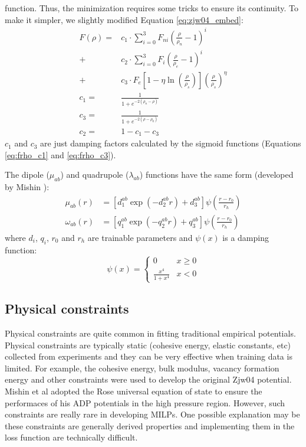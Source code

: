 \documentclass[prb,reprint,superscriptaddress]{revtex4-2}
\begin{document}
function. Thus, the minimization requires some tricks to ensure its continuity.
To make it simpler, we slightly modified Equation \ref{eq:zjw04_embed}:
\begin{align}
\label{eq:zjw04xc_embed}
F(\rho) 
= & c_1 \cdot
\sum_{i=0}^{3}{F_{ni}\left( \frac{\rho}{\rho_n} - 1 \right)^{i}} \nonumber \\
+ & c_2 \cdot 
\sum_{i=0}^{3}{F_{i}\left( \frac{\rho}{\rho_e} - 1 \right)^{i}} \nonumber \\
+ & c_3 \cdot
F_{e}\left[1 - \eta\ln\left( \frac{\rho}{\rho_s}\right)\right]
(\frac{\rho}{\rho_s})^{\eta} \\
\label{eq:frho_c1}
c_{1} = & \frac{1}{1 + e^{-2\left(\rho_{n} - \rho\right)}} \\
\label{eq:frho_c3}
c_{3} = & \frac{1}{1 + e^{-2\left(\rho - \rho_{0}\right)}} \\
c_{2} = & 1 - c_1 - c_3
\end{align}
$c_1$ and $c_3$ are just damping factors calculated by the sigmoid 
functions (Equations \ref{eq:frho_c1} and \ref{eq:frho_c3}).

The dipole ($\mu_{ab}$) and quadrupole ($\lambda_{ab}$) functions have the same 
form (developed by Mishin \cite{ADP0}):
\begin{align}
\label{eq:adp_dipole}
\mu_{ab}(r) & = \left[
    d_{1}^{ab} \exp\left( -d_{2}^{ab}r \right) + d_{3}^{ab}
\right] \psi\left( \frac{r - r_{0}}{r_{h}} \right) \\
\omega_{ab}(r) & = \left[
    q_{1}^{ab} \exp\left( -q_{2}^{ab}r \right) + q_{3}^{ab}
\right] \psi\left( \frac{r - r_{0}}{r_{h}} \right)
\end{align}
where $d_{i}$, $q_{i}$, $r_0$ and $r_{h}$ are trainable parameters and $\psi(x)$
is a damping function:
\begin{equation}
\label{eq:mishin_cutoff}
\psi(x) = \begin{cases}
    0 & x \ge 0 \\
    \frac{x^4}{1 + x^4} & x < 0 
\end{cases}
\end{equation}

\subsection{Physical constraints}
\label{sec:constraints}

Physical constraints are quite common in fitting traditional empirical 
potentials. Physical constraints are typically static (cohesive energy, elastic 
constants, etc) collected from experiments and they can be very effective when 
training data is limited. For example, the cohesive energy, bulk modulus, 
vacancy formation energy and other constraints were used to develop the original 
Zjw04 potential. Mishin et al adopted the Rose universal equation of state to 
ensure the performaces of his ADP potentials in the high pressure region. 
However, such constraints are really rare in developing MILPs. One possible 
explanation may be these constraints are generally derived properties and 
implementing them in the loss function are technically difficult.
\end{document}
